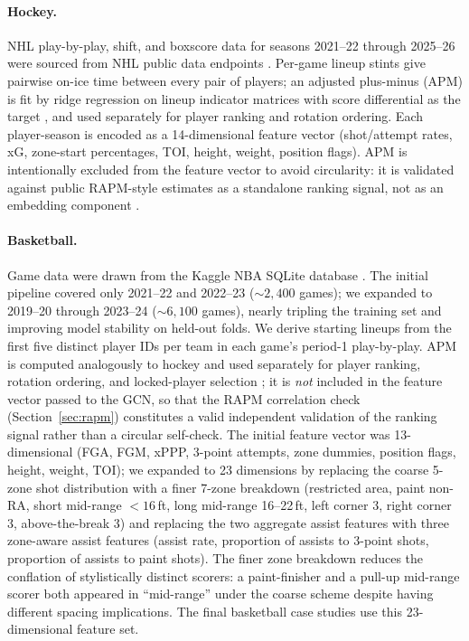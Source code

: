 \documentclass[12pt,letterpaper]{article}
\begin{document}
\paragraph{Hockey.}
NHL play-by-play, shift, and boxscore data for seasons 2021--22 through
2025--26 were sourced from NHL public data endpoints
\citep{nhlPublicApi}.
Per-game lineup stints give pairwise on-ice time between every pair of
players; an adjusted plus-minus (APM) is fit by ridge regression on
lineup indicator matrices with score differential as the target
\citep{hoerl1970ridge,macdonald2011nhl}, and used separately for
player ranking and rotation ordering.
Each player-season is encoded as a 14-dimensional feature vector
(shot/attempt rates, xG, zone-start percentages, TOI, height, weight,
position flags).
APM is intentionally excluded from the feature vector to avoid
circularity: it is validated against public RAPM-style estimates as a
standalone ranking signal, not as an embedding component
\citep{sill2010rapm,ghimire2020rapm}.

\paragraph{Basketball.}
Game data were drawn from the Kaggle NBA SQLite database
\citep{walshBasketball,walshNbadb}.
The initial pipeline covered only 2021--22 and 2022--23
(${\sim}2{,}400$ games); we expanded to 2019--20 through 2023--24
(${\sim}6{,}100$ games), nearly tripling the training set and improving
model stability on held-out folds.
We derive starting lineups from the first five distinct player IDs per
team in each game's period-1 play-by-play.
APM is computed analogously to hockey and used separately for player
ranking, rotation ordering, and locked-player selection
\citep{sill2010rapm,ghimire2020rapm}; it is \emph{not} included in the
feature vector passed to the GCN, so that the RAPM correlation check
(Section~\ref{sec:rapm}) constitutes a valid independent validation
of the ranking signal rather than a circular self-check.
The initial feature vector was 13-dimensional (FGA, FGM, xPPP, 3-point
attempts, zone dummies, position flags, height, weight, TOI); we
expanded to 23 dimensions by replacing the coarse 5-zone shot
distribution with a finer 7-zone breakdown (restricted area, paint
non-RA, short mid-range $<16$\,ft, long mid-range 16--22\,ft, left
corner 3, right corner 3, above-the-break 3) and replacing the two
aggregate assist features with three zone-aware assist features (assist
rate, proportion of assists to 3-point shots, proportion of assists to
paint shots).
The finer zone breakdown reduces the conflation of stylistically
distinct scorers: a paint-finisher and a pull-up mid-range scorer both
appeared in ``mid-range'' under the coarse scheme despite having
different spacing implications.
The final basketball case studies use this 23-dimensional feature set.
\end{document}
